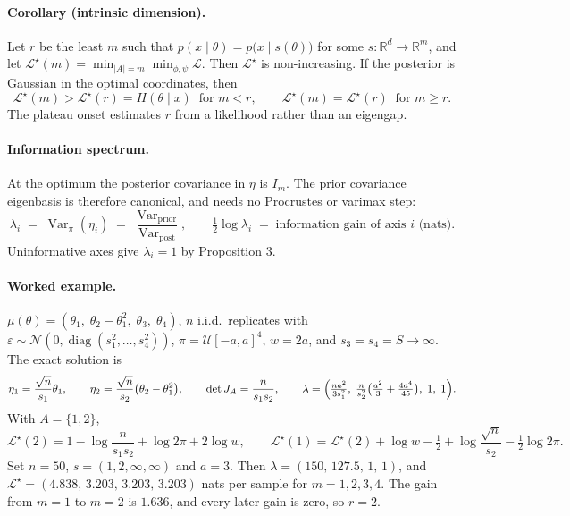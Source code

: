 \documentclass[11pt, letterpaper]{article}
\theoremstyle{definition}
\begin{document}
\paragraph{Corollary (intrinsic dimension).}
Let $r$ be the least $m$ such that $p(x\mid\theta)=p\bigl(x\mid s(\theta)\bigr)$
for some $s:\mathbb{R}^d\to\mathbb{R}^m$, and let
$\mathcal{L}^\star(m)=\min_{|A|=m}\min_{\phi,\psi}\mathcal{L}$. Then
$\mathcal{L}^\star$ is non-increasing. If the posterior is Gaussian in the
optimal coordinates, then
\begin{equation}
  \mathcal{L}^\star(m) > \mathcal{L}^\star(r) = H(\theta\mid x)
  \;\;\text{for } m<r,
  \qquad
  \mathcal{L}^\star(m) = \mathcal{L}^\star(r) \;\;\text{for } m\ge r .
\end{equation}
The plateau onset estimates $r$ from a likelihood rather than an eigengap.

\paragraph{Information spectrum.}
At the optimum the posterior covariance in $\eta$ is $I_m$. The prior covariance
eigenbasis is therefore canonical, and needs no Procrustes or varimax step:
\begin{equation}
  \lambda_i \;=\; \operatorname{Var}_\pi(\eta_i)
  \;=\; \frac{\operatorname{Var}_{\text{prior}}}{\operatorname{Var}_{\text{post}}},
  \qquad
  \tfrac12\log\lambda_i \;=\; \text{information gain of axis } i \text{ (nats)} .
\end{equation}
Uninformative axes give $\lambda_i=1$ by Proposition 3.

\paragraph{Worked example.}
$\mu(\theta)=(\theta_1,\;\theta_2-\theta_1^2,\;\theta_3,\;\theta_4)$,
$n$ i.i.d.\ replicates with $\varepsilon\sim\mathcal{N}(0,\operatorname{diag}(s_1^2,\dots,s_4^2))$,
$\pi=\mathcal{U}[-a,a]^4$, $w=2a$, and $s_3=s_4=S\to\infty$. The exact solution is
\[
  \eta_1=\frac{\sqrt n}{s_1}\theta_1,\qquad
  \eta_2=\frac{\sqrt n}{s_2}\bigl(\theta_2-\theta_1^2\bigr),\qquad
  \det J_A=\frac{n}{s_1s_2},\qquad
  \lambda=\Bigl(\tfrac{n a^2}{3s_1^2},\;\tfrac{n}{s_2^2}\bigl(\tfrac{a^2}{3}+\tfrac{4a^4}{45}\bigr),\;1,\;1\Bigr).
\]
With $A=\{1,2\}$,
\begin{equation}
  \mathcal{L}^\star(2)=1-\log\frac{n}{s_1s_2}+\log 2\pi+2\log w,
  \qquad
  \mathcal{L}^\star(1)=\mathcal{L}^\star(2)+\log w-\tfrac12+\log\frac{\sqrt n}{s_2}-\tfrac12\log 2\pi .
\end{equation}
Set $n=50$, $s=(1,2,\infty,\infty)$ and $a=3$. Then
$\lambda=(150,\,127.5,\,1,\,1)$, and
$\mathcal{L}^\star=(4.838,\,3.203,\,3.203,\,3.203)$ nats per sample for
$m=1,2,3,4$. The gain from $m=1$ to $m=2$ is $1.636$, and every later gain is
zero, so $r=2$.
\end{document}
